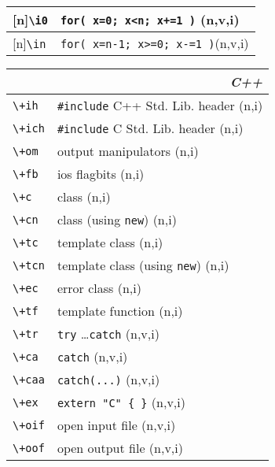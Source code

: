 \documentclass[oneside,11pt,landscape,DIV16]{scrartcl}
\newcommand{\Rep}{{\tiny{[n]}}}
\begin{document}
\begin{multicols}{3}
\begin{center}
\begin{tabular}[]{|p{11mm}|p{60mm}|}
\hline \Rep\verb'\i0'  & \verb'for( x=0; x<n; x+=1 )'   \hfill (n,v,i)\\
\hline \Rep\verb'\in'  & \verb'for( x=n-1; x>=0; x-=1 )'\hfill (n,v,i)\\
\hline
\end{tabular}
%
%
\begin{tabular}[]{|p{12mm}|p{60mm}|}
\hline 
\multicolumn{2}{|r|}{\textsl{C\textbf{++}}} \\
\hline \verb'\+ih'  & \verb$#include$ C++ Std. Lib. header \hfill (n,i)\\
\hline \verb'\+ich' & \verb$#include$ C   Std. Lib. header \hfill (n,i)\\
\hline \verb'\+om'  & output manipulators                  \hfill (n,i)\\
\hline \verb'\+fb'  & ios flagbits                         \hfill (n,i)\\
\hline
\hline \verb'\+c'   & class                                \hfill (n,i)\\
\hline \verb'\+cn'  & class (using \verb'new')             \hfill (n,i)\\
\hline \verb'\+tc'  & template class                       \hfill (n,i)\\
\hline \verb'\+tcn' & template class (using \verb'new')    \hfill (n,i)\\
\hline \verb'\+ec'  & error class                          \hfill (n,i)\\
\hline \verb'\+tf'  & template function                    \hfill (n,i)\\
\hline
\hline \verb'\+tr'  & \verb'try' \dots \verb'catch'        \hfill (n,v,i)\\
\hline \verb'\+ca'  & \verb'catch'                         \hfill (n,v,i)\\
\hline \verb'\+caa' & \verb'catch(...)'                    \hfill (n,v,i)\\
\hline
\hline \verb'\+ex'  & \verb'extern "C" { }'                \hfill (n,v,i)\\
\hline \verb'\+oif' & open input file                      \hfill (n,v,i)\\
\hline \verb'\+oof' & open output file                     \hfill (n,v,i)\\

\end{tabular}
\end{center}
\end{multicols}
\end{document}
